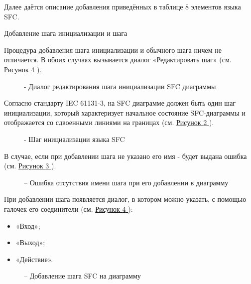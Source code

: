 \documentclass[letterpaper,10pt,russian]{sphinxmanual}
\begin{document}
Далее даётся описание добавления приведённых в таблице 8 элементов языка
SFC.

Добавление шага инициализации и шага

Процедура добавления шага инициализации и обычного шага ничем не
отличается. В обоих случаях вызывается диалог «Редактировать шаг» (см.
\hyperref[usage_guide/ide_components:image89]{Рисунок \ref{usage_guide/ide_components:image89} }).
\begin{figure}[htbp]
\centering
\capstart

\noindent{}
\caption{- Диалог редактирования шага инициализации SFC диаграммы}\label{usage_guide/ide_components:image90}\end{figure}

Согласно стандарту IEC 61131-3, на SFC диаграмме должен быть один шаг
инициализации, который характеризует начальное состояние SFC-диаграммы и
отображается со сдвоенными линиями на границах (см. \hyperref[usage_guide/ide_components:image91]{Рисунок \ref{usage_guide/ide_components:image91} }).
\begin{figure}[htbp]
\centering
\capstart

\noindent{}
\caption{- Шаг инициализации языка SFC}\label{usage_guide/ide_components:image91}\end{figure}

В случае, если при добавлении шага не указано его имя - будет выдана
ошибка (см. \hyperref[usage_guide/ide_components:image92]{Рисунок \ref{usage_guide/ide_components:image92} }).
\begin{figure}[htbp]
\centering
\capstart

\noindent{}
\caption{– Ошибка отсутствия имени шага при его добавлении в диаграмму}\label{usage_guide/ide_components:image92}\end{figure}

При добавлении шага появляется диалог, в котором можно указать, с
помощью галочек его соединители (см. \hyperref[usage_guide/ide_components:image89]{Рисунок \ref{usage_guide/ide_components:image89} }):
\begin{itemize}
\item {} 
«Вход»;

\item {} 
«Выход»;

\item {} 
«Действие».

\end{itemize}
\begin{figure}[htbp]
\centering
\capstart

\noindent{}
\caption{– Добавление шага SFC на диаграмму}\label{usage_guide/ide_components:image89}\end{figure}
\end{document}
